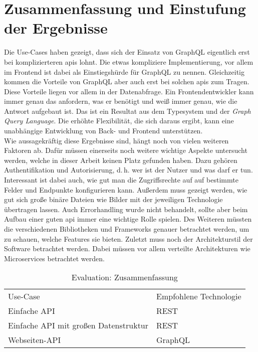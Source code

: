 \section{Zusammenfassung und Einstufung der Ergebnisse}

Die Use-Cases haben gezeigt, dass sich der Einsatz von GraphQL eigentlich erst bei komplizierteren \ac{api}s lohnt. Die etwas kompliziere Implementierung, vor allem im Frontend ist dabei als Einstiegshürde für GraphQL zu nennen. Gleichzeitig kommen die Vorteile von GraphQL aber auch erst bei solchen \ac{api}s zum Tragen. Diese Vorteile liegen vor allem in der Datenabfrage. Ein Frontendentwickler kann immer genau das anfordern, was er benötigt und weiß immer genau, wie die Antwort aufgebaut ist. Das ist ein Resultat aus dem Typesystem und der \textit{Graph Query Language}. Die erhöhte Flexibilität, die sich daraus ergibt, kann eine unabhängige Entwicklung von Back- und Frontend unterstützen. \\
Wie aussagekräftig diese Ergebnisse sind, hängt noch von vielen weiteren Faktoren ab. Dafür müssen einerseits noch weitere wichtige Aspekte untersucht werden, welche in dieser Arbeit keinen Platz gefunden haben. Dazu gehören Authentifikation und Autorisierung, d.\,h. wer ist der Nutzer und was darf er tun. Interessant ist dabei auch, wie gut man die Zugriffsrechte auf auf bestimmte Felder und Endpunkte konfigurieren kann. Außerdem muss gezeigt werden, wie gut sich große binäre Dateien wie Bilder mit der jeweiligen Technologie übertragen lassen. Auch Errorhandling wurde nicht behandelt, sollte aber beim Aufbau einer guten \ac{api} immer eine wichtige Rolle spielen. Des Weiteren müssten die verschiedenen Bibliotheken und Frameworks genauer betrachtet werden, um zu schauen, welche Features sie bieten. Zuletzt muss noch der Architekturstil der Software betrachtet werden. Dabei müssen vor allem verteilte Architekturen wie Microservices betrachtet werden.

\begin{table}[H]
\begin{tabular}{p{7cm} p{5cm}}
Use-Case & Empfohlene Technologie \\
Einfache API & REST \\
Einfache API mit großen Datenstruktur & REST \\
Webseiten-API &  GraphQL \\
\end{tabular}
\caption{Evaluation: Zusammenfassung}
\end{table}